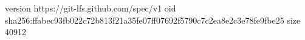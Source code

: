 version https://git-lfs.github.com/spec/v1
oid sha256:ffabec93fb022c72b813f21a35fe07ff07692f5790c7c2ea8e2c3e78fe9fbe25
size 40912
